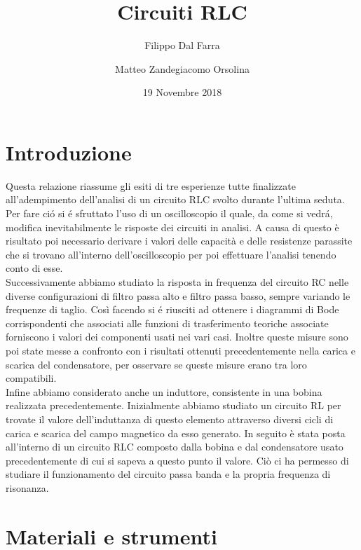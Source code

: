 \documentclass{article}
\title{Circuiti RLC}
\author{Filippo Dal Farra \and Matteo Zandegiacomo Orsolina}
\date{19 Novembre 2018}
\begin{document}
\maketitle

\newpage

\section{Introduzione}

Questa relazione riassume gli esiti di tre esperienze tutte finalizzate all'adempimento dell'analisi di un circuito RLC svolto durante l'ultima seduta. Per fare ci\'o si \'e sfruttato l'uso di un oscilloscopio il quale, da come si vedr\'a, modifica inevitabilmente le risposte dei circuiti in analisi. A causa di questo è risultato poi necessario derivare i valori delle capacità e delle resistenze parassite che si trovano all'interno dell'oscilloscopio per poi effettuare l'analisi tenendo conto di esse. \\

Successivamente abbiamo studiato la risposta in frequenza del circuito RC nelle diverse configurazioni di filtro passa alto e filtro passa basso, sempre variando le frequenze di taglio. Così facendo si \'e riusciti ad ottenere i diagrammi di Bode corrispondenti che associati alle funzioni di trasferimento teoriche associate forniscono i valori dei componenti usati nei vari casi. Inoltre queste misure sono poi state messe a confronto con i risultati ottenuti precedentemente nella carica e scarica del condensatore, per osservare se queste misure erano tra loro compatibili. \\

Infine abbiamo considerato anche un induttore, consistente in una bobina realizzata precedentemente. Inizialmente abbiamo studiato un circuito RL per trovate il valore dell'induttanza di questo elemento attraverso diversi cicli di carica e scarica del campo magnetico da esso generato. In seguito è stata posta all'interno di un circuito RLC composto dalla bobina e dal condensatore usato precedentemente di cui si sapeva a questo punto il valore. Ciò ci ha permesso di studiare il funzionamento del circuito passa banda e la propria frequenza di risonanza.

\newpage

\section{Materiali e strumenti}
\end{document}
